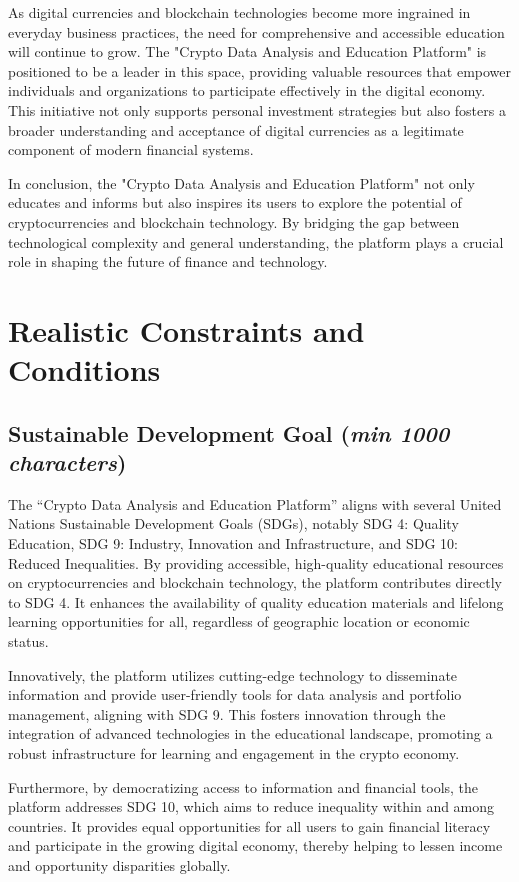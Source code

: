 \documentclass[12pt]{report}
\newcommand{\characters}[1]{(\textit{min #1 characters})}
\begin{document}
As digital currencies and blockchain technologies become more ingrained in everyday business practices, the need for comprehensive and accessible education will continue to grow. The "Crypto Data Analysis and Education Platform" is positioned to be a leader in this space, providing valuable resources that empower individuals and organizations to participate effectively in the digital economy. This initiative not only supports personal investment strategies but also fosters a broader understanding and acceptance of digital currencies as a legitimate component of modern financial systems.

In conclusion, the "Crypto Data Analysis and Education Platform" not only educates and informs but also inspires its users to explore the potential of cryptocurrencies and blockchain technology. By bridging the gap between technological complexity and general understanding, the platform plays a crucial role in shaping the future of finance and technology.

\section{Realistic Constraints and Conditions}

\subsection{Sustainable Development Goal \characters{1000}}
The ``Crypto Data Analysis and Education Platform'' aligns with several United Nations Sustainable Development Goals (SDGs), notably SDG 4: Quality Education, SDG 9: Industry, Innovation and Infrastructure, and SDG 10: Reduced Inequalities. By providing accessible, high-quality educational resources on cryptocurrencies and blockchain technology, the platform contributes directly to SDG 4. It enhances the availability of quality education materials and lifelong learning opportunities for all, regardless of geographic location or economic status.

Innovatively, the platform utilizes cutting-edge technology to disseminate information and provide user-friendly tools for data analysis and portfolio management, aligning with SDG 9. This fosters innovation through the integration of advanced technologies in the educational landscape, promoting a robust infrastructure for learning and engagement in the crypto economy.

Furthermore, by democratizing access to information and financial tools, the platform addresses SDG 10, which aims to reduce inequality within and among countries. It provides equal opportunities for all users to gain financial literacy and participate in the growing digital economy, thereby helping to lessen income and opportunity disparities globally.
\end{document}

